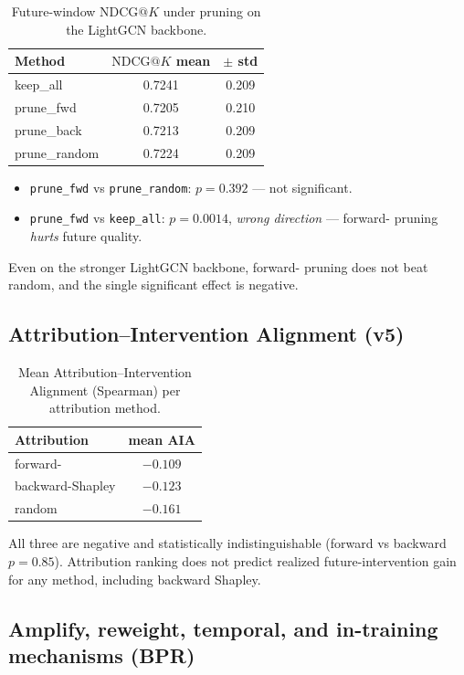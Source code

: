 \documentclass[pdflatex,sn-mathphys-num]{sn-jnl}%
\makeatletter
\theoremstyle{thmstyleone}%
\theoremstyle{thmstyletwo}%
\theoremstyle{thmstylethree}%
\newcommand{\CAV}{\mathrm{CAV}}
\newcommand{\NDCG}{\mathrm{NDCG@}K}
\makeatother
\begin{document}
\begin{table}[h]
\caption{Future-window $\NDCG{}$ under pruning on the LightGCN backbone.}
\label{tab:lgcnprune}
\centering
\begin{tabular}{lcc}
\toprule
Method & $\NDCG{}$ mean & $\pm$ std \\
\midrule
keep\_all   & 0.7241 & 0.209 \\
prune\_fwd  & 0.7205 & 0.210 \\
prune\_back & 0.7213 & 0.209 \\
prune\_random & 0.7224 & 0.209 \\
\bottomrule
\end{tabular}
\end{table}

\begin{itemize}
\item \texttt{prune\_fwd} vs \texttt{prune\_random}: $p=0.392$ --- not significant.
\item \texttt{prune\_fwd} vs \texttt{keep\_all}: $p=0.0014$, \emph{wrong direction} --- forward-\CAV{} pruning \emph{hurts} future quality.
\end{itemize}
Even on the stronger LightGCN backbone, forward-\CAV{} pruning does not beat random, and the single significant effect is negative.

\subsection{Attribution--Intervention Alignment (v5)}

\begin{table}[h]
\caption{Mean Attribution--Intervention Alignment (Spearman) per attribution method.}
\label{tab:aia}
\centering
\begin{tabular}{lc}
\toprule
Attribution & mean AIA \\
\midrule
forward-\CAV{} & $-0.109$ \\
backward-Shapley & $-0.123$ \\
random & $-0.161$ \\
\bottomrule
\end{tabular}
\end{table}

All three are negative and statistically indistinguishable (forward vs backward $p=0.85$). Attribution ranking does not predict realized future-intervention gain for any method, including backward Shapley.

\subsection{Amplify, reweight, temporal, and in-training mechanisms (BPR)}
\end{document}
